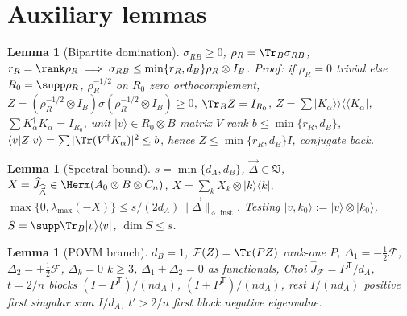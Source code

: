 \documentclass[11pt,a4paper]{article}
\newtheorem{lemma}[theorem]{Lemma}
\begin{document}
\section{Auxiliary lemmas}
\begin{lemma}[Bipartite domination]
$\sigma_{RB}\ge0$, $\rho_R=\Tr_B\sigma_{RB}$, $r_R=\rank\rho_R\implies\sigma_{RB}\le\min\{r_R,d_B\}\rho_R\otimes I_B$. Proof: if $\rho_R=0$ trivial else $R_0=\supp\rho_R$, $\rho_R^{-1/2}$ on $R_0$ zero orthocomplement, $Z=(\rho_R^{-1/2}\otimes I_B)\sigma(\rho_R^{-1/2}\otimes I_B)\ge0$, $\Tr_BZ=I_{R_0}$, $Z=\sum|K_\alpha\rangle\!\rangle\langle\!\langle K_\alpha|$, $\sum K_\alpha^\dagger K_\alpha=I_{R_0}$, unit $|v\rangle\in R_0\otimes B$ matrix $V$ rank $b\le\min\{r_R,d_B\}$, $\langle v|Z|v\rangle=\sum|\Tr(V^\dagger K_\alpha)|^2\le b$, hence $Z\le\min\{r_R,d_B\}I$, conjugate back.
\end{lemma}
\begin{lemma}[Spectral bound]
$s=\min\{d_A,d_B\}$, $\vec\Delta\in\mathfrak V$, $X=\widehat J_{\widehat{\vec\Delta}}\in\Herm(A_0\otimes B\otimes C_n)$, $X=\sum_kX_k\otimes|k\rangle\langle k|$, $\max\{0,\lambda_{\max}(-X)\}\le s/(2d_A)\|\vec\Delta\|_{\diamond,\mathrm{inst}}$. Testing $|v,k_0\rangle:=|v\rangle\otimes|k_0\rangle$, $S=\supp\Tr_B|v\rangle\langle v|$, $\dim S\le s$.
\end{lemma}
\begin{lemma}[POVM branch]
$d_B=1$, $\mathcal F(Z)=\Tr(PZ)$ rank-one $P$, $\Delta_1=-\frac12\mathcal F$, $\Delta_2=+\frac12\mathcal F$, $\Delta_k=0$ $k\ge3$, $\Delta_1+\Delta_2=0$ as functionals, Choi $\widehat J_{\mathcal F}=P^{\mathsf T}/d_A$, $t=2/n$ blocks $(I-P^{\mathsf T})/(nd_A)$, $(I+P^{\mathsf T})/(nd_A)$, rest $I/(nd_A)$ positive first singular sum $I/d_A$, $t'>2/n$ first block negative eigenvalue.
\end{lemma}
\end{document}
